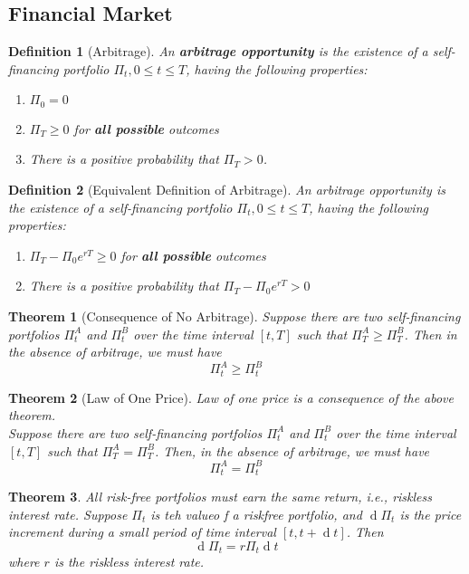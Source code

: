 \documentclass[12pt]{article}
\newtheorem{definition}{Definition}[section]
\newtheorem{theorem}{Theorem}[section]
\theoremstyle{definition}
\DeclareMathOperator{\diff}{d}
\begin{document}
\subsection{Financial Market}
\begin{definition}[Arbitrage]
\normalfont An \textbf{arbitrage opportunity} is the existence of a self-financing portfolio $\Pi_t, 0\leq t\leq T$, having the following properties:
\begin{enumerate}
  \item $\Pi_0=0$
  \item $\Pi_T\geq 0$ for \textbf{all possible} outcomes
  \item There is a positive probability that $\Pi_T>0$.
\end{enumerate}
\end{definition}
\begin{definition}[Equivalent Definition of Arbitrage]
\normalfont An arbitrage opportunity is the existence of a self-financing portfolio $\Pi_t, 0\leq t\leq T$, having the following properties:
\begin{enumerate}
  \item $\Pi_T-\Pi_0e^{rT}\geq 0$ for \textbf{all possible} outcomes
  \item There is a positive probability that $\Pi_T-\Pi_0e^{rT}>0$
\end{enumerate}
\end{definition}
\begin{theorem}[Consequence of No Arbitrage]
\normalfont Suppose there are two self-financing portfolios $\Pi_t^A$ and $\Pi_t^B$ over the time interval $[t,T]$ such that $\Pi_T^A\geq \Pi_T^B$. Then in the absence of arbitrage, we must have
\[
\Pi_t^A\geq \Pi_t^B
\]
\end{theorem}
\begin{theorem}[Law of One Price]
\normalfont Law of one price is a consequence of the above theorem.\\
Suppose there are two self-financing portfolios $\Pi_t^A$ and $\Pi_t^B$ over the time interval $[t,T]$ such that $\Pi_T^A = \Pi_T^B$. Then, in the absence of arbitrage, we must have
\[
\Pi_t^A = \Pi_t^B
\]
\end{theorem}
\begin{theorem}
\normalfont All \textit{risk-free} portfolios must earn the same return, i.e., \textit{riskless interest rate}. Suppose $\Pi_t$ is teh valueo f a riskfree portfolio, and $\diff\Pi_t$ is the price increment during a small period of time interval $[t,t+\diff t]$. Then
\[
\diff \Pi_t = r\Pi_t\diff t
\]
where $r$ is the riskless interest rate.
\end{theorem}
\end{document}
